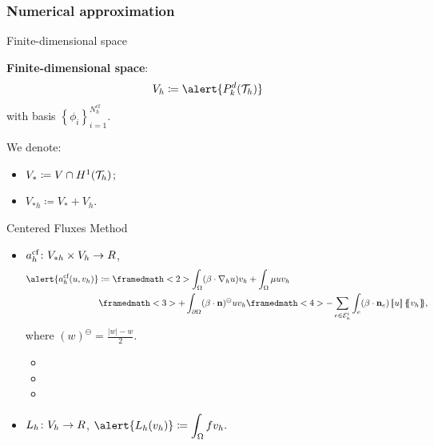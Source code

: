 	\subsubsection{Numerical approximation}
	
	\begin{frame}{Finite-dimensional space}
	
	\textbf{Finite-dimensional space}: $$V_h\coloneqq\alert{\mathbb{P}_k^d(\T_h)}$$ with basis $\left\{\phi_i\right\}_{i=1}^{N_h^{\text{cf}}}$.
	\vspace*{1cm}
	
	We denote:
	\begin{itemize}
		\item $V_*\coloneqq V\cap H^1(\mathcal{T}_h)$;
		\item $V_{*h}\coloneqq V_*+V_h$.
	\end{itemize}
	\end{frame}
	
	\begin{frame}{Centered Fluxes Method}
	\begin{itemize}\itemsep1em
		\item $a_h^{\text{cf}}\colon V_{*h}\times V_h\to\relax R$,
		\begin{align*}
		\alert{\acf{u}{v_h}}&\coloneqq\framedmath<2>{\displaystyle \int_\Omega(\beta\cdot\nabla_h u)v_h+\int_\Omega\mu u v_h}\\&\framedmath<3>{\displaystyle +\int_{\partial\Omega}(\beta\cdot\mathbf{n})^\ominus uv_h}\framedmath<4>{\displaystyle -\sum_{e\in\E_h^i}\int_e(\beta\cdot\mathbf{n}_e)\salto{u}\media{v_h}},
		\end{align*}
		where $(w)^\ominus=\frac{\vert w\vert - w}{2}$.
		\vspace*{0.3cm}
		\begin{itemize}
			\item<2> 
			\item<3> 
			\item<4> 
		\end{itemize}
		\item $L_h\colon V_h\to\relax R$, $\displaystyle \alert{L_h(v_h)}\coloneqq\int_\Omega f v_h.$
	\end{itemize}
\end{frame}

